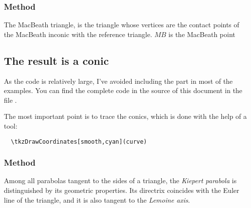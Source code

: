 \subsubsection{Method }
\label{ssub:method_triangle_macbeath}
The MacBeath triangle, is the triangle whose vertices are the contact points of the MacBeath inconic with the reference triangle. $MB$ is the MacBeath  point

\begin{tkzexample}[latex=.5\textwidth]
\end{tkzexample}




\subsection{The result is a conic}

As the code is relatively large, I've avoided including the  part in most of the examples. You can find the complete code in the source of this document in the file .

The most important point is to trace the conics, which is done with the help of a tool:

\begin{mybox}
\begin{verbatim}
  \tkzDrawCoordinates[smooth,cyan](curve)
\end{verbatim}
\end{mybox}

\subsubsection{Method }
\label{ssub:method_triangle_kiepert_parabola}

Among all parabolas tangent to the sides of a triangle, the \emph{Kiepert parabola} is distinguished by its geometric properties. Its directrix coincides with the Euler line of the triangle, and it is also tangent to the \emph{Lemoine axis}.

